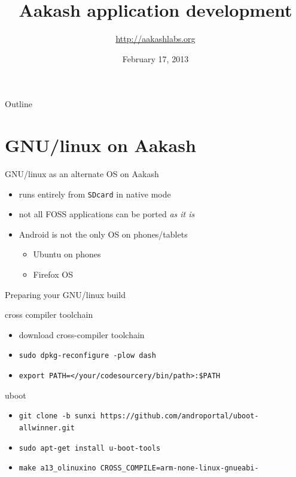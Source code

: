 \documentclass{beamer}
\title[Aakash application development]{Aakash application development}
\author{\url{http://aakashlabs.org}}
\institute{Indian Institute of Technology, Bombay}
\date{February 17, 2013}
\begin{document}
 \begin{frame}
   \titlepage
 \end{frame}
 \begin{frame}{Outline}
  \tableofcontents
 \end{frame}
 \section{GNU/linux on Aakash}
 \begin{frame}{GNU/linux as an alternate OS on Aakash}
   \begin{block}{}
     \begin{itemize}
       \item runs entirely from {\tt SDcard} in native mode
       \item not all FOSS applications can be ported {\em as it is}
       \item Android is not the only OS on phones/tablets \pause
         \begin{itemize}
         \item Ubuntu on phones
         \item Firefox OS
         \end{itemize}
     \end{itemize}
   \end{block}
 \end{frame}

 \begin{frame}{Preparing your GNU/linux build}
   \begin{block}{cross compiler toolchain}
     \begin{itemize}
     \item download cross-compiler toolchain
     \item {\tt sudo dpkg-reconfigure -plow dash}
     \item {\tt export PATH=</your/codesourcery/bin/path>:\$PATH }
     \end{itemize}
   \end{block}

   \begin{block}{uboot}
     \begin{itemize}
     \item {\tt git clone -b sunxi https://github.com/androportal/uboot-allwinner.git}
     \item {\tt sudo apt-get install u-boot-tools}
     \item {\tt make a13\_olinuxino CROSS\_COMPILE=arm-none-linux-gnueabi-}
     \end{itemize}
   \end{block}
 \end{frame}
\end{document}
